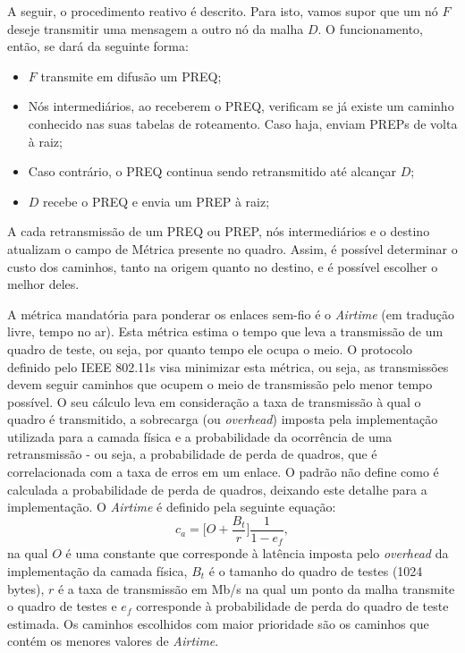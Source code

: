 \documentclass[letterpaper, 10 pt, conference]{ieeeconf}  %
\begin{document}
A seguir, o procedimento reativo é descrito. Para isto, vamos supor que um nó $F$ deseje transmitir uma mensagem a outro nó da malha $D$. O funcionamento, então, se dará da seguinte forma:

\begin{itemize}
	\item $F$ transmite em difusão um PREQ;
    \item Nós intermediários, ao receberem o PREQ, verificam se já existe um caminho conhecido nas suas tabelas de roteamento. Caso haja, enviam PREPs de volta à raiz;
    \item Caso contrário, o PREQ continua sendo retransmitido até alcançar $D$;
    \item $D$ recebe o PREQ e envia um PREP à raiz;
\end{itemize}

A cada retransmissão de um PREQ ou PREP, nós intermediários e o destino atualizam o campo de Métrica presente no quadro. Assim, é possível determinar o custo dos caminhos, tanto na origem quanto no destino, e é possível escolher o melhor deles.

A métrica mandatória para ponderar os enlaces sem-fio é o \textit{Airtime} (em tradução livre, tempo no ar). Esta métrica estima o tempo que leva a transmissão de um quadro de teste, ou seja, por quanto tempo ele ocupa o meio. O protocolo definido pelo IEEE 802.11s visa minimizar esta métrica, ou seja, as transmissões devem seguir caminhos que ocupem o meio de transmissão pelo menor tempo possível. O seu cálculo leva em consideração a taxa de transmissão à qual o quadro é transmitido, a sobrecarga (ou \textit{overhead}) imposta pela implementação utilizada para a camada física e a probabilidade da ocorrência de uma retransmissão - ou seja, a probabilidade de perda de quadros, que é correlacionada com a taxa de erros em um enlace. O padrão não define	como é calculada a probabilidade de perda de quadros, deixando este detalhe para a implementação. O \textit{Airtime} é definido pela seguinte equação:
%
\begin{equation}
	c_a=\Big[O + \frac{B_t}{r}\Big] \frac{1}{1-e_f},
\end{equation}
%
na qual $O$ é uma constante que corresponde à latência imposta pelo \textit{overhead} da implementação da camada física, $B_t$ é o tamanho do quadro de testes (1024 bytes), $r$ é a taxa de transmissão em Mb/s na qual um ponto da malha transmite o quadro de testes e $e_f$ corresponde à probabilidade de perda do quadro de teste estimada. Os caminhos escolhidos com maior prioridade são os caminhos que contém os menores valores de \textit{Airtime}.
\end{document}
